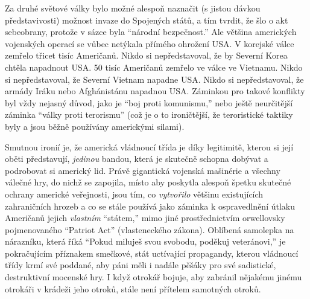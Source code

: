 \documentclass{book}
\begin{document}
Za druhé světové války bylo možné alespoň naznačit (s jistou dávkou představivosti) možnost invaze do Spojených států, a tím tvrdit, že šlo o akt sebeobrany, protože v sázce byla \enquote{národní bezpečnost.} Ale většina amerických vojenských operací se vůbec netýkala přímého ohrožení USA. V korejské válce zemřelo třicet tisíc Američanů. Nikdo si nepředstavoval, že by Severní Korea chtěla napadnout USA. 50 tisíc Američanů zemřelo ve válce ve Vietnamu. Nikdo si nepředstavoval, že Severní Vietnam napadne USA. Nikdo si nepředstavoval, že armády Iráku nebo Afghánistánu napadnou USA. Záminkou pro takové konflikty byl vždy nejasný důvod, jako je \enquote{boj proti komunismu,} nebo ještě neurčitější záminka \enquote{války proti terorismu} (což je o to ironičtější, že teroristické taktiky byly a jsou běžně používány americkými silami).

Smutnou ironií je, že americká vládnoucí třída je díky legitimitě, kterou si její oběti představují, \emph{jedinou} bandou, která je skutečně schopna dobývat a podrobovat si americký lid. Právě gigantická vojenská mašinérie a všechny válečné hry, do nichž se zapojila, místo aby poskytla alespoň špetku skutečné ochrany americké veřejnosti, jsou tím, co \emph{vytvořilo} většinu existujících zahraničních hrozeb a co se stále používá jako záminka k ospravedlnění útlaku Američanů jejich \emph{vlastním} \enquote{státem,} mimo jiné prostřednictvím orwellovsky pojmenovaného \enquote{Patriot Act} (vlasteneckého zákona). Oblíbená samolepka na nárazníku, která říká \enquote{Pokud miluješ svou svobodu, poděkuj veteránovi,} je pokračujícím příznakem smečkové, stát uctívající propagandy, kterou vládnoucí třídy krmí své poddané, aby páni měli i nadále pěšáky pro své sadistické, destruktivní mocenské hry. I když otrokář bojuje, aby zabránil nějakému jinému otrokáři v krádeži jeho otroků, stále není přítelem samotných otroků.
\end{document}
